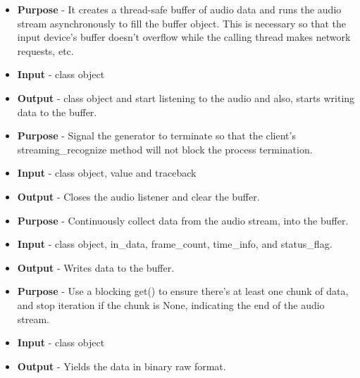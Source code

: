 \documentclass[12pt]{article}
\newcounter{subsubsubsection}[subsubsection]
\begin{document}
\begin{itemize}
    \setlength{\itemsep}{1pt}
    \item \textbf{Purpose} - It creates a thread-safe buffer of audio data and runs the audio stream asynchronously to fill the buffer object. This is necessary so that the input device's buffer doesn't overflow while the calling thread makes network requests, etc.
    \item \textbf{Input} - class object
    \item \textbf{Output} - class object and start listening to the audio and also, starts writing data to the buffer.
\end{itemize}

\begin{itemize}
    \setlength{\itemsep}{1pt}
    \item \textbf{Purpose} - Signal the generator to terminate so that the client's streaming\_recognize method will not block the process termination.
    \item \textbf{Input} - class object, value and traceback 
    \item \textbf{Output} - Closes the audio listener and clear the buffer.
\end{itemize}

\begin{itemize}
    \setlength{\itemsep}{1pt}
    \item \textbf{Purpose} - Continuously collect data from the audio stream, into the buffer.
    \item \textbf{Input} - class object, in\_data, frame\_count, time\_info, and status\_flag.

    \item \textbf{Output} - Writes data to the buffer.
\end{itemize}

\begin{itemize}
    \setlength{\itemsep}{1pt}
    \item \textbf{Purpose} - Use a blocking get() to ensure there's at least one chunk of data, and stop iteration if the chunk is None, indicating the end of the audio stream.
    \item \textbf{Input} - class object
    \item \textbf{Output} - Yields the data in binary raw format.
\end{itemize}
\end{document}
